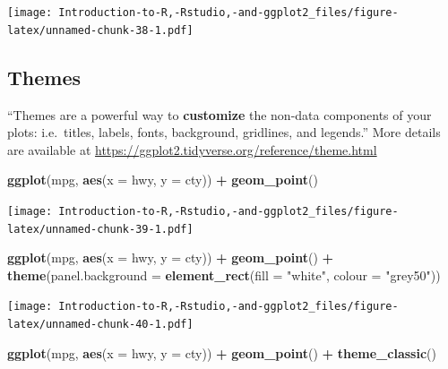 \documentclass[]{book}
\newenvironment{Shaded}{\begin{snugshade}}{\end{snugshade}}
\newcommand{\DataTypeTok}[1]{\textcolor[rgb]{0.13,0.29,0.53}{#1}}
\newcommand{\KeywordTok}[1]{\textcolor[rgb]{0.13,0.29,0.53}{\textbf{#1}}}
\newcommand{\NormalTok}[1]{#1}
\newcommand{\OperatorTok}[1]{\textcolor[rgb]{0.81,0.36,0.00}{\textbf{#1}}}
\newcommand{\StringTok}[1]{\textcolor[rgb]{0.31,0.60,0.02}{#1}}
\begin{document}
\texttt{[image: Introduction-to-R,-Rstudio,-and-ggplot2\_files/figure-latex/unnamed-chunk-38-1.pdf]}

\hypertarget{themes}{%
\subsection{Themes}\label{themes}}

``Themes are a powerful way to \textbf{customize} the non-data components of your plots: i.e.~titles, labels, fonts, background, gridlines, and legends.'' More details are available at \url{https://ggplot2.tidyverse.org/reference/theme.html}

\begin{Shaded}
\begin{Highlighting}[]
\KeywordTok{ggplot}\NormalTok{(mpg, }\KeywordTok{aes}\NormalTok{(}\DataTypeTok{x =}\NormalTok{ hwy, }\DataTypeTok{y =}\NormalTok{ cty)) }\OperatorTok{+}\StringTok{ }\KeywordTok{geom_point}\NormalTok{() }
\end{Highlighting}
\end{Shaded}

\texttt{[image: Introduction-to-R,-Rstudio,-and-ggplot2\_files/figure-latex/unnamed-chunk-39-1.pdf]}

\begin{Shaded}
\begin{Highlighting}[]
\KeywordTok{ggplot}\NormalTok{(mpg, }\KeywordTok{aes}\NormalTok{(}\DataTypeTok{x =}\NormalTok{ hwy, }\DataTypeTok{y =}\NormalTok{ cty)) }\OperatorTok{+}\StringTok{ }\KeywordTok{geom_point}\NormalTok{() }\OperatorTok{+}\StringTok{ }\KeywordTok{theme}\NormalTok{(}\DataTypeTok{panel.background =} \KeywordTok{element_rect}\NormalTok{(}\DataTypeTok{fill =} \StringTok{"white"}\NormalTok{, }\DataTypeTok{colour =} \StringTok{"grey50"}\NormalTok{))}
\end{Highlighting}
\end{Shaded}

\texttt{[image: Introduction-to-R,-Rstudio,-and-ggplot2\_files/figure-latex/unnamed-chunk-40-1.pdf]}

\begin{Shaded}
\begin{Highlighting}[]
\KeywordTok{ggplot}\NormalTok{(mpg, }\KeywordTok{aes}\NormalTok{(}\DataTypeTok{x =}\NormalTok{ hwy, }\DataTypeTok{y =}\NormalTok{ cty)) }\OperatorTok{+}\StringTok{ }\KeywordTok{geom_point}\NormalTok{() }\OperatorTok{+}\StringTok{ }\KeywordTok{theme_classic}\NormalTok{()}
\end{Highlighting}
\end{Shaded}
\end{document}
